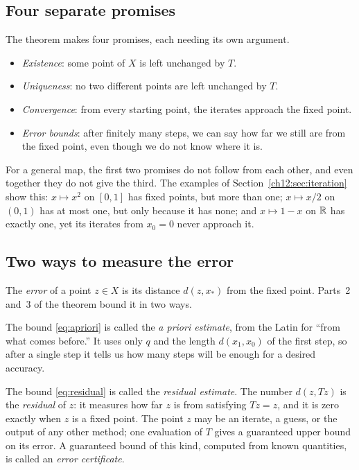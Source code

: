 \subsection*{Four separate promises}
The theorem makes four promises, each needing its own argument.
\begin{itemize}
\item \emph{Existence}: some point of $X$ is left unchanged by $T$.
\item \emph{Uniqueness}: no two different points are left unchanged by $T$.
\item \emph{Convergence}: from every starting point, the iterates approach the fixed point.
\item \emph{Error bounds}: after finitely many steps, we can say how far we still are from the fixed point, even though we do not know where it is.
\end{itemize}
For a general map, the first two promises do not follow from each other, and even together they do not give the third. The examples of Section~\ref{ch12:sec:iteration} show this: $x\mapsto x^2$ on $[0,1]$ has fixed points, but more than one; $x\mapsto x/2$ on $(0,1)$ has at most one, but only because it has none; and $x\mapsto1-x$ on $\mathbb R$ has exactly one, yet its iterates from $x_0=0$ never approach it.


\subsection*{Two ways to measure the error}
The \emph{error} of a point $z\in X$ is its distance $d(z,x_*)$ from the fixed point. Parts~2 and~3 of the theorem bound it in two ways.

The bound \eqref{eq:apriori} is called the \emph{a priori estimate}, from the Latin for ``from what comes before.'' It uses only $q$ and the length $d(x_1,x_0)$ of the first step, so after a single step it tells us how many steps will be enough for a desired accuracy.

The bound \eqref{eq:residual} is called the \emph{residual estimate}. The number $d(z,Tz)$ is the \emph{residual} of $z$: it measures how far $z$ is from satisfying $Tz=z$, and it is zero exactly when $z$ is a fixed point. The point $z$ may be an iterate, a guess, or the output of any other method; one evaluation of $T$ gives a guaranteed upper bound on its error. A guaranteed bound of this kind, computed from known quantities, is called an \emph{error certificate}.


